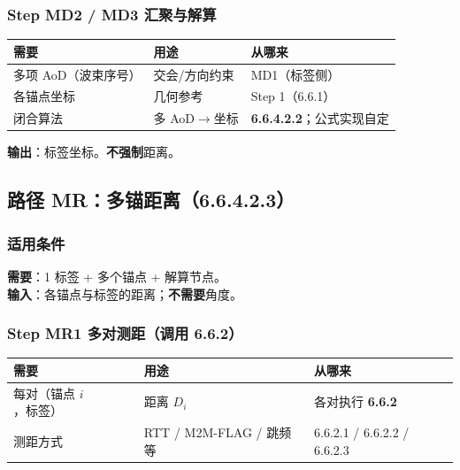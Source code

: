 \documentclass[11pt,a4paper]{ctexart}
\begin{document}
\subsubsection{Step MD2 / MD3 汇聚与解算}

\begin{table}[h]
\centering
\small
\begin{tabular}{L{3.4cm}L{4.8cm}L{4.8cm}}
\toprule
\textbf{需要} & \textbf{用途} & \textbf{从哪来} \\
\midrule
多项 AoD（波束序号） & 交会/方向约束 & MD1（标签侧） \\
各锚点坐标 & 几何参考 & Step 1（6.6.1） \\
闭合算法 & 多 AoD$\rightarrow$坐标 & \textbf{6.6.4.2.2}；公式实现自定 \\
\bottomrule
\end{tabular}
\end{table}

\textbf{输出}：标签坐标。\textbf{不强制}距离。

\subsection{路径 MR：多锚距离（6.6.4.2.3）}
\label{sec:mr}

\subsubsection{适用条件}

\textbf{需要}：1 标签 + 多个锚点 + 解算节点。\\
\textbf{输入}：各锚点与标签的距离；\textbf{不需要}角度。

\subsubsection{Step MR1 多对测距（调用 6.6.2）}

\begin{table}[h]
\centering
\small
\begin{tabular}{L{3.4cm}L{4.8cm}L{4.8cm}}
\toprule
\textbf{需要} & \textbf{用途} & \textbf{从哪来} \\
\midrule
每对（锚点 $i$，标签） & 距离 $D_i$ & 各对执行 \textbf{6.6.2} \\
测距方式 & RTT / M2M-FLAG / 跳频等 & 6.6.2.1 / 6.6.2.2 / 6.6.2.3 \\
\bottomrule
\end{tabular}
\end{table}
\end{document}
